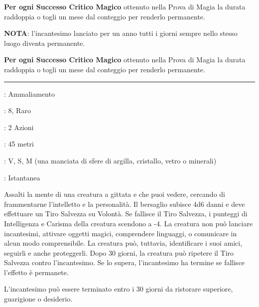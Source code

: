 \begin{multicols}{2}
\textbf{Per ogni Successo Critico Magico} ottenuto nella Prova di Magia la durata raddoppia o togli un mese dal conteggio per renderlo permanente.

\textbf{NOTA}: l'incantesimo lanciato per un anno tutti i giorni sempre nello stesso luogo diventa permanente.

\textbf{Per ogni Successo Critico Magico} ottenuto nella Prova di Magia la durata raddoppia o togli un mese dal conteggio per renderlo permanente.

\smallskip\noindent\rule{\linewidth}{2pt} \hypertarget{Regressione Mentale}{}\smallskip{}
\noindent
\begin{description}[noitemsep, topsep=0pt, parsep=0pt, partopsep=0pt, leftmargin=0cm, labelwidth=2.8cm]
	\item[\textbf{Lista di Magia}]: Ammaliamento
	\item[\textbf{Livello}]: 8, Raro
	\item[\textbf{T. di Lancio}]: 2 Azioni
	\item[\textbf{Gittata}]: 45 metri
	\item[\textbf{Componenti}]: V, S, M (una manciata di sfere di argilla, cristallo, vetro o minerali)
	\item[\textbf{Durata}]: Istantanea
\end{description}

Assalti la mente di una creatura a gittata e che puoi vedere, cercando di frammentarne l'intelletto e la personalità. Il bersaglio subisce 4d6 danni e deve effettuare un Tiro Salvezza su Volontà. Se fallisce il Tiro Salvezza, i punteggi di Intelligenza e Carisma della creatura scendono a -4. La creatura non può lanciare incantesimi, attivare oggetti magici, comprendere linguaggi, o comunicare in alcun modo comprensibile. La creatura può, tuttavia, identificare i suoi amici, seguirli e anche proteggerli. Dopo 30 giorni, la creatura può ripetere il Tiro Salvezza contro l'incantesimo. Se lo supera, l'incantesimo ha termine se fallisce l'effetto è permanete.

L'incantesimo può essere terminato entro i 30 giorni da ristorare superiore, guarigione o desiderio.


\end{multicols}
